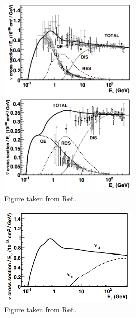 \begin{figure} %
    \includegraphics[origin=c,width=0.6\textwidth]{diagrams/4-wc/cross_sections.png}
    \caption[cross sections short]
    {Figure taken from Ref.\cite{formaggio2012}.}
    \label{fig:cross_sections}
\end{figure} %

\begin{figure} %
    \includegraphics[origin=c,width=0.6\textwidth]{diagrams/4-wc/tau_comparison.png}
    \caption[tau comparison short]
    {Figure taken from Ref.\cite{formaggio2012}.}
    \label{fig:tau_comparison}
\end{figure} %

